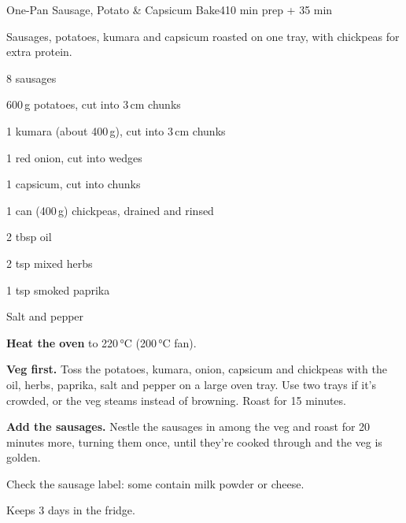 \begin{recipebox}{One-Pan Sausage, Potato \& Capsicum Bake}{4}{10 min prep + 35 min}

Sausages, potatoes, kumara and capsicum roasted on one tray, with chickpeas for
extra protein.

\begin{ingredients}
  \item 8 sausages
  \item 600\,g potatoes, cut into 3\,cm chunks
  \item 1 kumara (about 400\,g), cut into 3\,cm chunks
  \item 1 red onion, cut into wedges
  \item 1 capsicum, cut into chunks
  \item 1 can (400\,g) chickpeas, drained and rinsed
  \item 2 tbsp oil
  \item 2 tsp mixed herbs
  \item 1 tsp smoked paprika
  \item Salt and pepper
\end{ingredients}

\begin{method}
  \item \textbf{Heat the oven} to 220\,°C (200\,°C fan).
  \item \textbf{Veg first.} Toss the potatoes, kumara, onion, capsicum and chickpeas
        with the oil, herbs, paprika, salt and pepper on a large oven tray. Use two
        trays if it's crowded, or the veg steams instead of browning. Roast for 15
        minutes.
  \item \textbf{Add the sausages.} Nestle the sausages in among the veg and roast
        for 20 minutes more, turning them once, until they're cooked through and
        the veg is golden.
\end{method}

\begin{notelist}
  \item Check the sausage label: some contain milk powder or cheese.
  \item Keeps 3 days in the fridge.
\end{notelist}

\end{recipebox}
